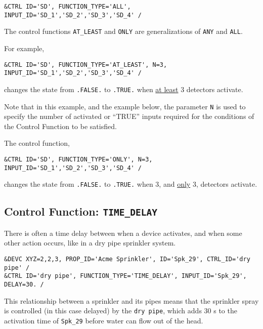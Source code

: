 \documentclass[11pt]{book}
\newcommand{\ct}{\tt\small}
\begin{document}
\footnotesize
\begin{verbatim}
&CTRL ID='SD', FUNCTION_TYPE='ALL', INPUT_ID='SD_1','SD_2','SD_3','SD_4' /
\end{verbatim}
\normalsize

\noindent

The control functions {\ct AT\_LEAST} and {\ct ONLY} are generalizations of {\ct ANY} and {\ct ALL}.

For example,

\footnotesize
\begin{verbatim}
&CTRL ID='SD', FUNCTION_TYPE='AT_LEAST', N=3, INPUT_ID='SD_1','SD_2','SD_3','SD_4' /
\end{verbatim}

\normalsize
\noindent
changes the state from {\ct .FALSE.} to {\ct .TRUE.} when \underline{at least}
3 detectors activate.

Note that in this example, and the example below, the parameter {\ct N} is used to
specify the number of activated or ``TRUE'' inputs required for the conditions
of the Control Function to be satisfied.

The control function,

\footnotesize
\begin{verbatim}
&CTRL ID='SD', FUNCTION_TYPE='ONLY', N=3, INPUT_ID='SD_1','SD_2','SD_3','SD_4' /
\end{verbatim}

\normalsize
\noindent
changes the state from {\ct .FALSE.} to {\ct .TRUE.} when 3,
and \underline{only} 3, detectors activate.


\subsection{Control Function: \texorpdfstring{{\tt TIME\_DELAY}}{TIME_DELAY}}

There is often a time delay 
between when a device activates, and when some other action occurs, like in a dry pipe sprinkler system.

\footnotesize
\begin{verbatim}
&DEVC XYZ=2,2,3, PROP_ID='Acme Sprinkler', ID='Spk_29', CTRL_ID='dry pipe' /
&CTRL ID='dry pipe', FUNCTION_TYPE='TIME_DELAY', INPUT_ID='Spk_29', DELAY=30. /
\end{verbatim}
\normalsize

\noindent
This relationship between a sprinkler and its pipes means that the sprinkler spray is controlled (in this case delayed) by the
{\ct dry pipe}, which adds 30 s to the activation time of {\ct Spk\_29} before water can flow out of the head. %
\end{document}
